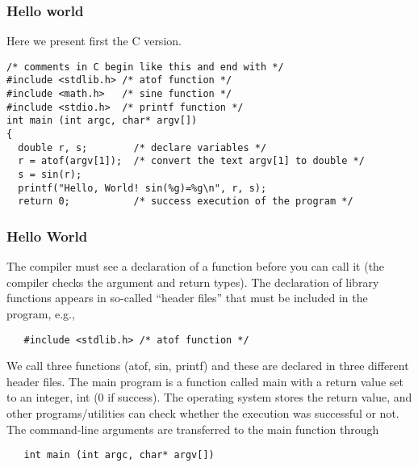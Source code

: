 \documentclass{beamer}
\newenvironment{block_mdfboxadmon}[1][]{\begin{block}{#1}}{\end{block}}
\begin{document}
\begin{frame}
\frametitle{Hello world}

\begin{block_mdfboxadmon}
Here we present first the C version.

\begin{verbatim}
/* comments in C begin like this and end with */
#include <stdlib.h> /* atof function */
#include <math.h>   /* sine function */
#include <stdio.h>  /* printf function */
int main (int argc, char* argv[])
{
  double r, s;        /* declare variables */
  r = atof(argv[1]);  /* convert the text argv[1] to double */
  s = sin(r);
  printf("Hello, World! sin(%g)=%g\n", r, s);
  return 0;           /* success execution of the program */

\end{verbatim}
\end{block_mdfboxadmon}
\end{frame}

\begin{frame}
\frametitle{Hello World}

\begin{block_mdfboxadmon}[Dissection I.]
The compiler must see a declaration of a function before you can
call it (the compiler checks the argument and return types).
The declaration of library functions appears
in so-called ``header files'' that must be included in the program, e.g.,

\begin{verbatim}
   #include <stdlib.h> /* atof function */
\end{verbatim}
We call three functions (atof, sin, printf)
and these are declared in three different header files.
The main program is a function called main
with a return value set to an integer, int (0 if success).
The operating system stores the return value,
and other programs/utilities can check whether
the execution was successful or not.
The command-line arguments are transferred to the main function through

\begin{verbatim}
   int main (int argc, char* argv[])
\end{verbatim}
\end{block_mdfboxadmon}
\end{frame}
\end{document}
